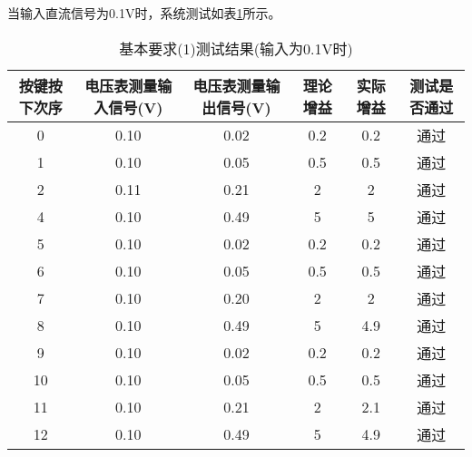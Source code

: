 \documentclass[lang=cn,11pt,a4paper]{elegantpaper}
\begin{document}
当输入直流信号为0.1V时，系统测试如表\ref{tab:1_0.1V}所示。
\begin{table}[!ht]
  \centering
  \caption{基本要求(1)测试结果(输入为0.1V时)}
  \begin{tabular}{cccccc}
    \textbf{按键按下次序} & \textbf{电压表测量输入信号(V)} & \textbf{电压表测量输出信号(V)} & \textbf{理论增益} & \textbf{实际增益} & \textbf{测试是否通过} \\ \hline
    0               & 0.10                  & 0.02                  & 0.2           & 0.2           & 通过              \\
    1               & 0.10                  & 0.05                  & 0.5           & 0.5           & 通过              \\
    2               & 0.11                  & 0.21                  & 2             & 2             & 通过              \\
    4               & 0.10                  & 0.49                  & 5             & 5             & 通过              \\
    5               & 0.10                  & 0.02                  & 0.2           & 0.2           & 通过              \\
    6               & 0.10                  & 0.05                  & 0.5           & 0.5           & 通过              \\
    7               & 0.10                  & 0.20                  & 2             & 2             & 通过              \\
    8               & 0.10                  & 0.49                  & 5             & 4.9           & 通过              \\
    9               & 0.10                  & 0.02                  & 0.2           & 0.2           & 通过              \\
    10              & 0.10                  & 0.05                  & 0.5           & 0.5           & 通过              \\
    11              & 0.10                  & 0.21                  & 2             & 2.1           & 通过              \\
    12              & 0.10                  & 0.49                  & 5             & 4.9           & 通过              \\
  \end{tabular}
  \label{tab:1_0.1V}
\end{table}
\end{document}
